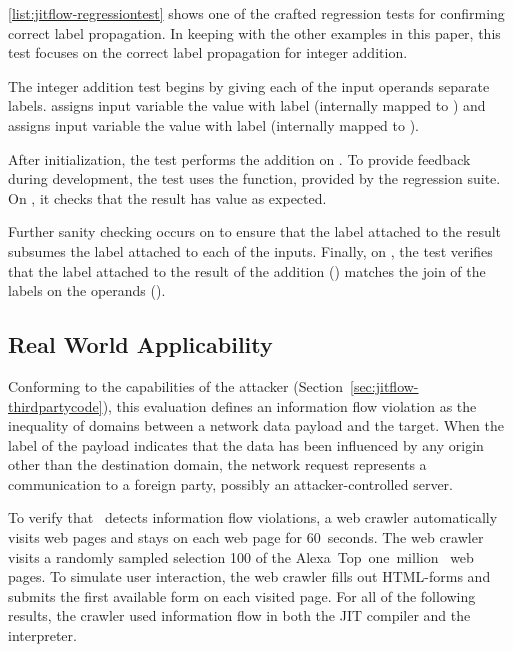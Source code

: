 \autoref{list:jitflow-regressiontest} shows one of the crafted regression tests for confirming correct label propagation.
In keeping with the other examples in this paper, this test focuses on the correct label propagation for integer addition.

The integer addition test begins by giving each of the input operands separate labels.
 assigns input variable  the value  with label  (internally mapped to ) and  assigns input variable  the value  with label  (internally mapped to ).

After initialization, the test performs the addition on .
To provide feedback during development, the test uses the  function, provided by the regression suite.
On , it checks that the result has value  as expected.

Further sanity checking occurs on  to ensure that the label attached to the result subsumes the label attached to each of the inputs.
Finally, on , the test verifies that the label attached to the result of the addition () matches the join of the labels on the operands ().


\subsection{Real World Applicability}
\label{sec:realworldapplicability}

Conforming to the capabilities of the attacker (Section~\ref{sec:jitflow-thirdpartycode}), this evaluation defines an information flow violation as the inequality of domains between a network data payload and the target.
When the label of the payload indicates that the data has been influenced by any origin other than the destination domain, the network request represents a communication to a foreign party, possibly an attacker-controlled server.

To verify that \JitFlow\ detects information flow violations, a web crawler automatically visits web pages and stays on each web page for 60~seconds.
The web crawler visits a randomly sampled selection 100 of the Alexa~Top~one~million~\cite{alexa} web pages.
To simulate user interaction, the web crawler fills out HTML-forms and submits the first available form on each visited page.
For all of the following results, the crawler used information flow in both the JIT compiler and the interpreter.

